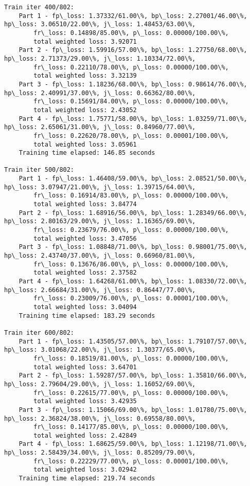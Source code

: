 \documentclass[11pt]{article}
\begin{document}
\begin{Verbatim}[commandchars=\\\{\}]
Train iter 400/802:
	Part 1 - fp\_loss: 1.37332/61.00\%, bp\_loss: 2.27001/46.00\%, hp\_loss: 3.06510/22.00\%, j\_loss: 1.48453/63.00\%, 
		fr\_loss: 0.14898/85.00\%, p\_loss: 0.00000/100.00\%, 
		total weighted loss: 3.92071
	Part 2 - fp\_loss: 1.59916/57.00\%, bp\_loss: 1.27750/68.00\%, hp\_loss: 2.71373/29.00\%, j\_loss: 1.10334/72.00\%, 
		fr\_loss: 0.22110/78.00\%, p\_loss: 0.00000/100.00\%, 
		total weighted loss: 3.32139
	Part 3 - fp\_loss: 1.18236/68.00\%, bp\_loss: 0.98614/76.00\%, hp\_loss: 2.40991/37.00\%, j\_loss: 0.66362/80.00\%, 
		fr\_loss: 0.15691/84.00\%, p\_loss: 0.00000/100.00\%, 
		total weighted loss: 2.43052
	Part 4 - fp\_loss: 1.75771/58.00\%, bp\_loss: 1.03259/71.00\%, hp\_loss: 2.65061/31.00\%, j\_loss: 0.84960/77.00\%, 
		fr\_loss: 0.22620/78.00\%, p\_loss: 0.00001/100.00\%, 
		total weighted loss: 3.05961
	Training time elapsed: 146.85 seconds

Train iter 500/802:
	Part 1 - fp\_loss: 1.46408/59.00\%, bp\_loss: 2.08521/50.00\%, hp\_loss: 3.07947/21.00\%, j\_loss: 1.39715/64.00\%, 
		fr\_loss: 0.16914/83.00\%, p\_loss: 0.00000/100.00\%, 
		total weighted loss: 3.84774
	Part 2 - fp\_loss: 1.68916/56.00\%, bp\_loss: 1.28349/66.00\%, hp\_loss: 2.80163/29.00\%, j\_loss: 1.16365/69.00\%, 
		fr\_loss: 0.23679/76.00\%, p\_loss: 0.00000/100.00\%, 
		total weighted loss: 3.47056
	Part 3 - fp\_loss: 1.08848/71.00\%, bp\_loss: 0.98001/75.00\%, hp\_loss: 2.43740/37.00\%, j\_loss: 0.66960/81.00\%, 
		fr\_loss: 0.13676/86.00\%, p\_loss: 0.00000/100.00\%, 
		total weighted loss: 2.37582
	Part 4 - fp\_loss: 1.64268/61.00\%, bp\_loss: 1.08330/72.00\%, hp\_loss: 2.66684/31.00\%, j\_loss: 0.86447/77.00\%, 
		fr\_loss: 0.23009/76.00\%, p\_loss: 0.00001/100.00\%, 
		total weighted loss: 3.04094
	Training time elapsed: 183.29 seconds

Train iter 600/802:
	Part 1 - fp\_loss: 1.43505/57.00\%, bp\_loss: 1.79107/57.00\%, hp\_loss: 3.01068/22.00\%, j\_loss: 1.30377/65.00\%, 
		fr\_loss: 0.18519/81.00\%, p\_loss: 0.00000/100.00\%, 
		total weighted loss: 3.64701
	Part 2 - fp\_loss: 1.59287/57.00\%, bp\_loss: 1.35810/66.00\%, hp\_loss: 2.79604/29.00\%, j\_loss: 1.16052/69.00\%, 
		fr\_loss: 0.22615/77.00\%, p\_loss: 0.00000/100.00\%, 
		total weighted loss: 3.42935
	Part 3 - fp\_loss: 1.15066/69.00\%, bp\_loss: 1.01780/75.00\%, hp\_loss: 2.36824/38.00\%, j\_loss: 0.69558/80.00\%, 
		fr\_loss: 0.14177/85.00\%, p\_loss: 0.00000/100.00\%, 
		total weighted loss: 2.42849
	Part 4 - fp\_loss: 1.68625/59.00\%, bp\_loss: 1.12198/71.00\%, hp\_loss: 2.58439/34.00\%, j\_loss: 0.85209/79.00\%, 
		fr\_loss: 0.22229/77.00\%, p\_loss: 0.00001/100.00\%, 
		total weighted loss: 3.02942
	Training time elapsed: 219.74 seconds


\end{Verbatim}
\end{document}
